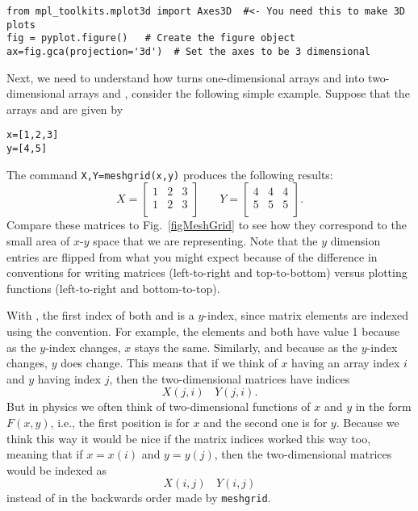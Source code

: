 \begin{Verbatim}
from mpl_toolkits.mplot3d import Axes3D  #<- You need this to make 3D plots
fig = pyplot.figure()   # Create the figure object
ax=fig.gca(projection='3d')  # Set the axes to be 3 dimensional
\end{Verbatim}

Next, we need to understand how  turns one-dimensional arrays
 and  into two-dimensional arrays 
and , consider the following simple example. Suppose that
the arrays  and  are given by
\begin{Verbatim}
x=[1,2,3]
y=[4,5]
\end{Verbatim}
The command {\tt X,Y=meshgrid(x,y)} produces the following
results:
\begin{equation}\label{eq:MeshgridMatrices}
X = \left[ \begin{array}{lll}
1 & 2 & 3 \\
1 & 2 & 3 \\
\end{array}
\right]~~~~~~~~ Y = \left[ \begin{array}{lll}
4 & 4 & 4 \\
5 & 5 & 5 \\
\end{array}
\right] .
\end{equation}
Compare these matrices to Fig.~\ref{figMeshGrid} to see how they
correspond to the small area of $x$-$y$ space that we are
representing.  Note that the $y$ dimension entries are flipped from
what you might expect because of the difference in conventions for
writing matrices (left-to-right and top-to-bottom) versus plotting
functions (left-to-right and bottom-to-top).

 With , the first index of both 
and  is a $y$-index, since matrix elements are indexed using the
 convention. For example, the elements  and
 both have value 1 because as the $y$-index changes, $x$ stays the
same. Similarly,  and  because as the
$y$-index changes, $y$ does change. This means that if we think of $x$
having an array index $i$ and $y$ having index $j$, then the two-dimensional
matrices have indices
\begin{equation}
    X(j,i)~~~~Y(j,i)  .
\end{equation}
But in physics we often think of two-dimensional functions of $x$ and $y$ in
the form $F(x,y)$, i.e., the first position is for $x$ and the second one is
for $y$. Because we think this way it would be nice if the matrix indices
worked this way too, meaning that if $x=x(i)$ and $y=y(j)$, then the
two-dimensional matrices would be indexed as
\begin{equation}
X(i,j)~~~~Y(i,j)
\end{equation}
instead of in the backwards order made by {\tt meshgrid}.

